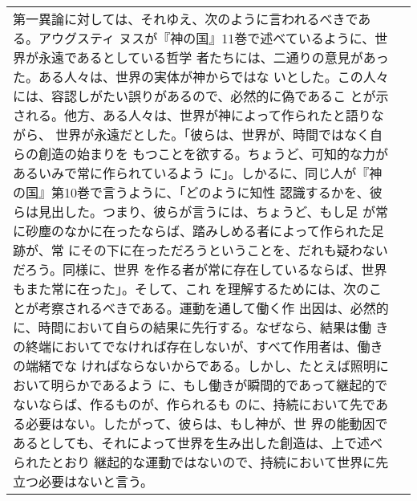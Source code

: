 \documentclass[10pt]{jsarticle} %
\begin{document}
\begin{longtable}{p{21em}p{21em}}
第一異論に対しては、それゆえ、次のように言われるべきである。アウグスティ
ヌスが『神の国』11巻で述べているように、世界が永遠であるとしている哲学
者たちには、二通りの意見があった。ある人々は、世界の実体が神からではな
いとした。この人々には、容認しがたい誤りがあるので、必然的に偽であるこ
とが示される。他方、ある人々は、世界が神によって作られたと語りながら、
世界が永遠だとした。「彼らは、世界が、時間ではなく自らの創造の始まりを
もつことを欲する。ちょうど、可知的な力があるいみで常に作られているよう
に」。しかるに、同じ人が『神の国』第10巻で言うように、「どのように知性
認識するかを、彼らは見出した。つまり、彼らが言うには、ちょうど、もし足
が常に砂塵のなかに在ったならば、踏みしめる者によって作られた足跡が、常
にその下に在っただろうということを、だれも疑わないだろう。同様に、世界
を作る者が常に存在しているならば、世界もまた常に在った」。そして、これ
を理解するためには、次のことが考察されるべきである。運動を通して働く作
出因は、必然的に、時間において自らの結果に先行する。なぜなら、結果は働
きの終端においてでなければ存在しないが、すべて作用者は、働きの端緒でな
ければならないからである。しかし、たとえば照明において明らかであるよう
に、もし働きが瞬間的であって継起的でないならば、作るものが、作られるも
のに、持続において先である必要はない。したがって、彼らは、もし神が、世
界の能動因であるとしても、それによって世界を生み出した創造は、上で述べ
られたとおり
継起的な運動ではないので、持続において世界に先立つ必要はないと言う。


\end{longtable}
\end{document}
